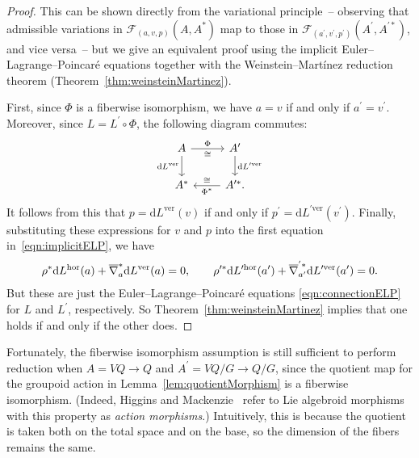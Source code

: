 \documentclass[pdftex]{sigma}
\numberwithin{equation}{section}
\begin{document}
\begin{proof}
This can be shown directly from the variational principle~-- observing that admissible variations in $ \mathcal{F} _{ ( a, v, p ) } ( A , A ^\ast ) $ map to those in $ \mathcal{F} _{ ( a ^\prime , v ^\prime , p ^\prime ) } ( A ^\prime , A ^{ \prime \ast } ) $, and vice versa~-- but we give an equivalent proof using the implicit Euler--Lagrange--Poincar\'e equations together with the Weinstein--Mart\'inez reduction theorem (Theorem~\ref{thm:weinsteinMartinez}).

First, since $ \Phi $ is a f\/iberwise isomorphism, we have $ a = v $ if and only if $ a ^\prime = v ^\prime $. Moreover, since $ L = L ^\prime \circ \Phi $, the following diagram commutes:
 \begin{equation*}
 \begin{tikzcd}
 A \ar[r, "\Phi", "\cong"'] \ar[d, "\mathrm{d} L ^\text{ver}"'] &
 A ^\prime \ar[d, "\mathrm{d} L ^{\prime \text{ver}}"]\\
 A ^\ast & \ar[l, "\Phi ^\ast ", "\cong"'] A ^{ \prime \ast }.
 \end{tikzcd}
 \end{equation*}
 It follows from this that $ p = \mathrm{d} L ^\text{ver} (v) $ if and only if $ p ^\prime = \mathrm{d} L ^{ \prime \text{ver}} ( v ^\prime ) $. Finally, substituting these expressions for $v$ and $p$ into the f\/irst equation in~\eqref{eqn:implicitELP}, we have
 \begin{gather*}
 \rho ^\ast \mathrm{d} L ^\textup{hor} (a) + \overline{ \nabla }_a ^\ast \mathrm{d} L ^\textup{ver} (a) = 0 , \qquad \rho ^{\prime \ast} \mathrm{d} L ^{\prime \textup{hor}} (a ^\prime ) + \overline{ \nabla } _{a ^\prime } ^{^\prime \ast} \mathrm{d} L ^{\prime \textup{ver}} (a ^\prime ) = 0 .
 \end{gather*}
But these are just the Euler--Lagrange--Poincar\'e equations \eqref{eqn:connectionELP} for $L$ and $ L ^\prime $, respectively. So Theorem~\ref{thm:weinsteinMartinez} implies that one holds if and only if the other does.
\end{proof}

Fortunately, the f\/iberwise isomorphism assumption is still suf\/f\/icient to perform reduction when $ A = V Q \rightarrow Q $ and $ A ^\prime = V Q / G \rightarrow Q / G $, since the quotient map for the groupoid action in Lemma~\ref{lem:quotientMorphism} is a f\/iberwise isomorphism. (Indeed, Higgins and Mackenzie~\cite{HiMa1993} refer to Lie algebroid morphisms with this property as \emph{action morphisms}.) Intuitively, this is because the quotient is taken both on the total space and on the base, so the dimension of the f\/ibers remains the same.
\end{document}
